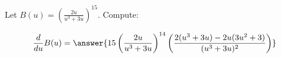 \documentclass{ximera}
\author{Bobby Ramsey}
\begin{document}
\begin{exercise}

	Let $B(u) = \left( \frac{2u}{u^3+3u}\right)^{15}$. Compute:

	\[ \dd{u}B(u) =\answer{ 15 \left(\frac{2u}{u^3+3u}\right)^{14} \left( \frac{2(u^3+3u)-2u(3u^2+3)}{(u^3+3u)^2} \right)  } \]

\end{exercise}
\end{document}
